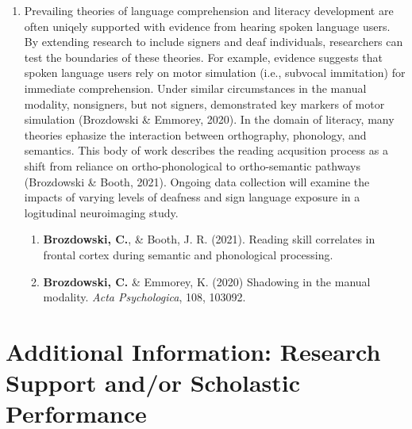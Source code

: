 \documentclass{nihbiosketch}
\begin{document}
\begin{enumerate}
\begin{enumerate}
\end{enumerate}
\item Prevailing theories of language comprehension and literacy development are often
 uniqely supported with evidence from hearing spoken language users. By extending
 research to include signers and deaf individuals, researchers can test the boundaries
 of these theories. For example, evidence suggests that spoken language users rely on
 motor simulation (i.e., subvocal immitation) for immediate comprehension. Under
 similar circumstances in the manual modality, nonsigners, but not signers,
 demonstrated key markers of motor simulation (Brozdowski \& Emmorey, 2020). In the
 domain of literacy, many theories ephasize the interaction between orthography,
 phonology, and semantics. This body of work describes the reading acqusition process
 as a shift from reliance on ortho-phonological to ortho-semantic pathways
 (Brozdowski \& Booth, 2021). Ongoing data collection will
 examine the impacts of varying levels of deafness and sign language exposure in a
 logitudinal neuroimaging study.

\begin{enumerate}   

\item \textbf{Brozdowski, C.}, \& Booth, J. R. (2021). Reading skill correlates in
        frontal cortex during semantic and phonological processing.

\item \textbf{Brozdowski, C.} \& Emmorey, K. (2020) Shadowing in the manual modality.
        \textit{Acta Psychologica}, 108, 103092.

\end{enumerate}

\end{enumerate}


\section{Additional Information: Research Support and/or Scholastic Performance}
\end{document}
